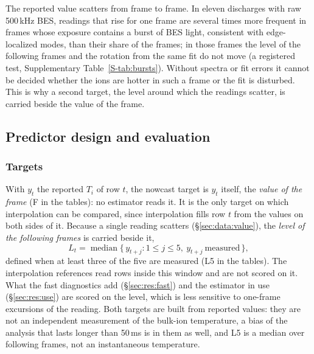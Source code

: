 \documentclass[11pt,a4paper]{article}
\newcommand{\Ti}{\ensuremath{T_i}}
\newcommand{\SuppTab}[1]{Supplementary Table~\ref{S-#1}}
\begin{document}
The reported value scatters from frame to frame. In eleven discharges with raw 500\,kHz BES, readings that rise for one frame are several times more frequent in frames whose exposure contains a burst of BES light, consistent with edge-localized modes, than their share of the frames; in those frames the level of the following frames and the rotation from the same fit do not move (a registered test, \SuppTab{tab:bursts}). Without spectra or fit errors it cannot be decided whether the ions are hotter in such a frame or the fit is disturbed. This is why a second target, the level around which the readings scatter, is carried beside the value of the frame.

\subsection{Predictor design and evaluation}
\label{sec:methods}

\subsubsection{Targets}
\label{sec:methods:target}

With $y_t$ the reported \Ti{} of row $t$, the nowcast target is $y_t$ itself, the \emph{value of the frame} (F in the tables): no estimator reads it. It is the only target on which interpolation can be compared, since interpolation fills row $t$ from the values on both sides of it. Because a single reading scatters (\S\ref{sec:data:value}), the \emph{level of the following frames} is carried beside it,
\begin{equation}
  L_t = \operatorname{median}\bigl\{\,y_{t+j} : 1 \le j \le 5,\ y_{t+j}\ \text{measured}\,\bigr\},
  \label{eq:target}
\end{equation}
defined when at least three of the five are measured (L5 in the tables). The interpolation references read rows inside this window and are not scored on it. What the fast diagnostics add (\S\ref{sec:res:fast}) and the estimator in use (\S\ref{sec:res:use}) are scored on the level, which is less sensitive to one-frame excursions of the reading. Both targets are built from reported values: they are not an independent measurement of the bulk-ion temperature, a bias of the analysis that lasts longer than 50\,ms is in them as well, and L5 is a median over following frames, not an instantaneous temperature.
\end{document}
